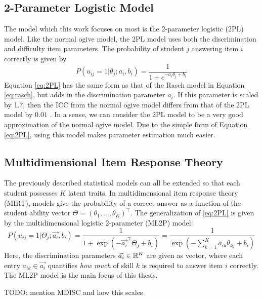 \subsection{2-Parameter Logistic Model}
The model which this work focuses on most is the 2-parameter logistic (2PL) model. Like the normal ogive model, the 2PL model uses both the discrimination and difficulty item parameters. The probability of student $j$ answering item $i$ correctly is given by
\begin{equation}
  P(u_{ij} = 1 | \theta_j; a_i, b_i) = \frac{1}{1 + e^{-a_i \theta_j + b_i}}
  \label{eq:2PL}
\end{equation}
Equation \ref{eq:2PL} has the same form as that of the Rasch model in Equation \ref{eq:rasch}, but adds in the discrimination parameter $a_i$. If this parameter is scaled by 1.7, then the ICC from the normal ogive model differs from that of the 2PL model by $0.01$ \cite{baker_kim2004}. In a sense, we can consider the 2PL model to be a very good approximation of the normal ogive model. Due to the simple form of Equation \ref{eq:2PL}, using this model makes parameter estimation much easier.

\subsection{Multidimensional Item Response Theory}
The previously described statistical models can all be extended so that each student possesses $K$ latent traits. In multidimensional item response theory (MIRT), models give the probability of a correct answer as a function of the student ability vector $\Theta = (\theta_1,\ldots, \theta_K)^\top$. The generalization of \ref{eq:2PL} is given by the multidimensional logistic 2-parameter (ML2P) model:
\begin{equation}
P(u_{ij} = 1 | \Theta_j; \vec{a_i}, b_i) = \frac{1}{1 + \exp\left(-\vec{a_i}^\top \Theta_j + b_i\right)} = \frac{1}{\exp\left(-\sum_{k=1}^K a_{ik} \theta_{kj} + b_i \right)}
  \label{eq:ml2p}
\end{equation}
Here, the discrimination parameters $\vec{a_i} \in \mathbb{R}^K$ are given as vector, where each entry $a_{ik} \in \vec{a_i}$ quantifies \textit{how much} of skill $k$ is required to answer item $i$ correctly. The ML2P model is the main focus of this thesis.

TODO: mention MDISC and how this scales

